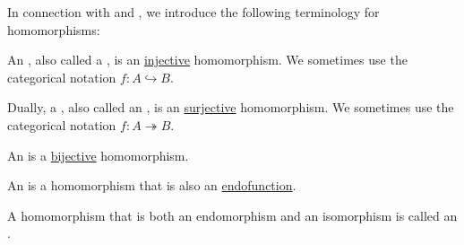 \begin{definition}\label{def:first_order_homomorphism_invertibility}
  In connection with  and , we introduce the following terminology for homomorphisms:
  \begin{thmenum}
     An , also called a , is an \hyperref[def:function_invertibility/injection]{injective} homomorphism. We sometimes use the categorical notation \( f: A \hookrightarrow B \).

     Dually, a , also called an , is an \hyperref[def:function_invertibility/surjection]{surjective} homomorphism. We sometimes use the categorical notation \( f: A \twoheadrightarrow B \).

     An  is a \hyperref[def:function_invertibility/bijection]{bijective} homomorphism.

     An  is a homomorphism that is also an \hyperref[def:multi_valued_function/endofunction]{endofunction}.

     A homomorphism that is both an endomorphism and an isomorphism is called an .
  \end{thmenum}
\end{definition}

